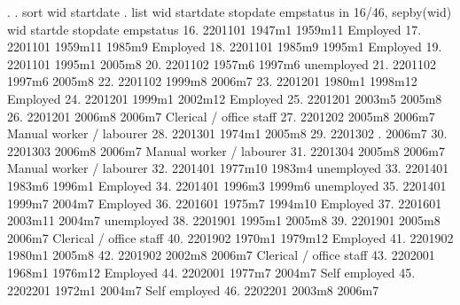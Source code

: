 . 
. sort wid startdate
{\smallskip}
. list wid startdate  stopdate empstatus in 16/46, sepby(wid)
{\smallskip}
     {\TLC}
     {\VBAR}     wid   startd{\tytilde}e   stopdate                  empstatus {\VBAR}
     {\LFTT}
 16. {\VBAR} 2201101     1947m1    1959m11                   Employed {\VBAR}
 17. {\VBAR} 2201101    1959m11     1985m9                   Employed {\VBAR}
 18. {\VBAR} 2201101     1985m9     1995m1                   Employed {\VBAR}
 19. {\VBAR} 2201101     1995m1     2005m8                            {\VBAR}
     {\LFTT}
 20. {\VBAR} 2201102     1957m6     1997m6                 unemployed {\VBAR}
 21. {\VBAR} 2201102     1997m6     2005m8                            {\VBAR}
 22. {\VBAR} 2201102     1999m8     2006m7                            {\VBAR}
     {\LFTT}
 23. {\VBAR} 2201201     1980m1    1998m12                   Employed {\VBAR}
 24. {\VBAR} 2201201     1999m1    2002m12                   Employed {\VBAR}
 25. {\VBAR} 2201201     2003m5     2005m8                            {\VBAR}
 26. {\VBAR} 2201201     2006m8     2006m7    Clerical / office staff {\VBAR}
     {\LFTT}
 27. {\VBAR} 2201202     2005m8     2006m7   Manual worker / labourer {\VBAR}
     {\LFTT}
 28. {\VBAR} 2201301     1974m1     2005m8                            {\VBAR}
     {\LFTT}
 29. {\VBAR} 2201302          .     2006m7                            {\VBAR}
     {\LFTT}
 30. {\VBAR} 2201303     2006m8     2006m7   Manual worker / labourer {\VBAR}
     {\LFTT}
 31. {\VBAR} 2201304     2005m8     2006m7   Manual worker / labourer {\VBAR}
     {\LFTT}
 32. {\VBAR} 2201401    1977m10     1983m4                 unemployed {\VBAR}
 33. {\VBAR} 2201401     1983m6     1996m1                   Employed {\VBAR}
 34. {\VBAR} 2201401     1996m3     1999m6                 unemployed {\VBAR}
 35. {\VBAR} 2201401     1999m7     2004m7                   Employed {\VBAR}
     {\LFTT}
 36. {\VBAR} 2201601     1975m7    1994m10                   Employed {\VBAR}
 37. {\VBAR} 2201601    2003m11     2004m7                 unemployed {\VBAR}
     {\LFTT}
 38. {\VBAR} 2201901     1995m1     2005m8                            {\VBAR}
 39. {\VBAR} 2201901     2005m8     2006m7    Clerical / office staff {\VBAR}
     {\LFTT}
 40. {\VBAR} 2201902     1970m1    1979m12                   Employed {\VBAR}
 41. {\VBAR} 2201902     1980m1     2005m8                            {\VBAR}
 42. {\VBAR} 2201902     2002m8     2006m7    Clerical / office staff {\VBAR}
     {\LFTT}
 43. {\VBAR} 2202001     1968m1    1976m12                   Employed {\VBAR}
 44. {\VBAR} 2202001     1977m7     2004m7              Self employed {\VBAR}
     {\LFTT}
 45. {\VBAR} 2202201     1972m1     2004m7              Self employed {\VBAR}
 46. {\VBAR} 2202201     2003m8     2006m7                            {\VBAR}
     {\BLC}
